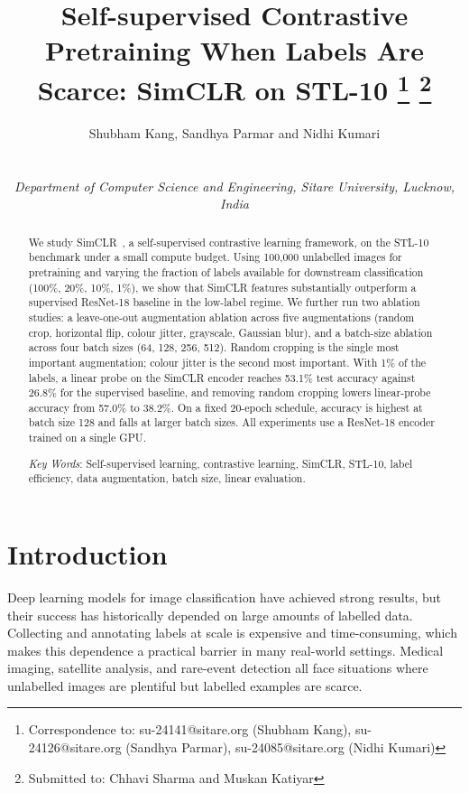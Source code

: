 \documentclass[twoside,a4paper,11pt]{article}
\title{Self-supervised Contrastive Pretraining When Labels Are Scarce:
SimCLR on STL-10
\footnote[0]{Correspondence to: su-24141@sitare.org (Shubham Kang),
su-24126@sitare.org (Sandhya Parmar), su-24085@sitare.org (Nidhi Kumari)
\vspace{0.2cm}}
\footnote[0]{\noindent Submitted to: Chhavi Sharma and Muskan Katiyar}
}
\author{Shubham Kang, Sandhya Parmar and Nidhi Kumari \\ \\
\centerline{\small \em Department of Computer Science and Engineering, Sitare University, Lucknow, India}
}
\begin{document}
\maketitle

\pagestyle{plain}
\hrulefill

\begin{abstract}

We study SimCLR~\cite{chen2020simclr}, a self-supervised contrastive learning
framework, on the STL-10 benchmark under a small compute budget. Using 100,000
unlabelled images for pretraining and varying the fraction of labels available for
downstream classification (100\%, 20\%, 10\%, 1\%), we show that SimCLR features
substantially outperform a supervised ResNet-18 baseline in the low-label regime. We
further run two ablation studies: a leave-one-out augmentation ablation across five
augmentations (random crop, horizontal flip, colour jitter, grayscale, Gaussian blur),
and a batch-size ablation across four batch sizes (64, 128, 256, 512). Random cropping
is the single most important augmentation; colour jitter is the second most important.
With 1\% of the labels, a linear probe on the SimCLR encoder reaches 53.1\% test
accuracy against 26.8\% for the supervised baseline, and removing random cropping lowers
linear-probe accuracy from 57.0\% to 38.2\%. On a fixed 20-epoch schedule, accuracy is
highest at batch size 128 and falls at larger batch sizes. All experiments use a
ResNet-18 encoder trained on a single GPU.

\vspace{0.5cm}
\noindent
{\em Key Words}: Self-supervised learning, contrastive learning, SimCLR, STL-10,
label efficiency, data augmentation, batch size, linear evaluation.

\end{abstract}
\hrulefill

\section{Introduction}
\label{sec:intro}

Deep learning models for image classification have achieved strong results, but their
success has historically depended on large amounts of labelled data. Collecting and
annotating labels at scale is expensive and time-consuming, which makes this dependence
a practical barrier in many real-world settings. Medical imaging, satellite analysis,
and rare-event detection all face situations where unlabelled images are plentiful but
labelled examples are scarce.
\end{document}
